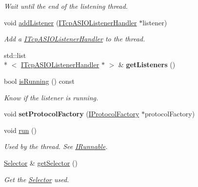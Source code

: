 \begin{DoxyCompactItemize}
\begin{DoxyCompactList}\small\item\em Wait until the end of the listening thread. \end{DoxyCompactList}\item 
void \hyperlink{classmognetwork_1_1_tcp_a_s_i_o_listener_a0d0b24852fdd94ad5096a87a40bc7712}{add\-Listener} (\hyperlink{classmognetwork_1_1_i_tcp_a_s_i_o_listener_handler}{I\-Tcp\-A\-S\-I\-O\-Listener\-Handler} $\ast$listener)
\begin{DoxyCompactList}\small\item\em Add a \hyperlink{classmognetwork_1_1_i_tcp_a_s_i_o_listener_handler}{I\-Tcp\-A\-S\-I\-O\-Listener\-Handler} to the thread. \end{DoxyCompactList}\item 
\hypertarget{classmognetwork_1_1_tcp_a_s_i_o_listener_a62e79cdf9b10b0e3330afa7599bdd827}{std\-::list\\*
$<$ \hyperlink{classmognetwork_1_1_i_tcp_a_s_i_o_listener_handler}{I\-Tcp\-A\-S\-I\-O\-Listener\-Handler} $\ast$ $>$ \& {\bfseries get\-Listeners} ()}\label{classmognetwork_1_1_tcp_a_s_i_o_listener_a62e79cdf9b10b0e3330afa7599bdd827}

\item 
bool \hyperlink{classmognetwork_1_1_tcp_a_s_i_o_listener_a431eb0fb3fab8042a9ef0b79d706fffc}{is\-Running} () const 
\begin{DoxyCompactList}\small\item\em Know if the listener is running. \end{DoxyCompactList}\item 
\hypertarget{classmognetwork_1_1_tcp_a_s_i_o_listener_a4a55377778098698900de6e246d42cc7}{void {\bfseries set\-Protocol\-Factory} (\hyperlink{classmognetwork_1_1_i_protocol_factory}{I\-Protocol\-Factory} $\ast$protocol\-Factory)}\label{classmognetwork_1_1_tcp_a_s_i_o_listener_a4a55377778098698900de6e246d42cc7}

\item 
\hypertarget{classmognetwork_1_1_tcp_a_s_i_o_listener_a445dcd4bf6dfe75c7715af0fecf9494d}{void \hyperlink{classmognetwork_1_1_tcp_a_s_i_o_listener_a445dcd4bf6dfe75c7715af0fecf9494d}{run} ()}\label{classmognetwork_1_1_tcp_a_s_i_o_listener_a445dcd4bf6dfe75c7715af0fecf9494d}

\begin{DoxyCompactList}\small\item\em Used by the thread. See \hyperlink{classmognetwork_1_1_i_runnable}{I\-Runnable}. \end{DoxyCompactList}\item 
\hyperlink{classmognetwork_1_1_selector}{Selector} \& \hyperlink{classmognetwork_1_1_tcp_a_s_i_o_listener_aed4473511088d8bc91ce118334eed24d}{get\-Selector} ()
\begin{DoxyCompactList}\small\item\em Get the \hyperlink{classmognetwork_1_1_selector}{Selector} used. \end{DoxyCompactList}\end{DoxyCompactItemize}


